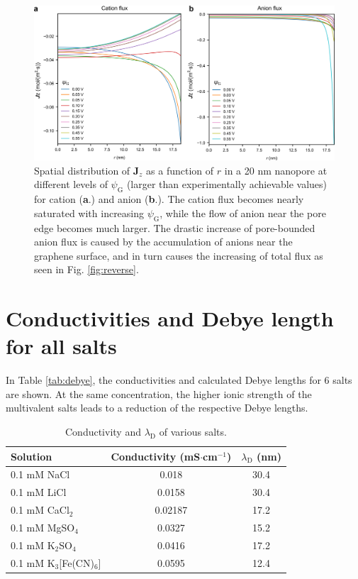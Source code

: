 \documentclass[manuscript=suppinfo,email=true, hyperref=true, keywords=false]{achemso}
\newcommand{\Fig}{Fig.}
\begin{document}
\begin{figure}[htbp]
  \centering
  \includegraphics[width=0.8\linewidth]{img/SI-flux-larger.png}
  \caption{Spatial distribution of $\boldsymbol{J}_{z}$ as a function
    of $r$ in a 20 nm nanopore at different levels of
    $\psi_{\mathrm{G}}$ (larger than experimentally achievable values)
    for cation (\textbf{a}.) and anion (\textbf{b}.). The cation flux
    becomes nearly saturated with increasing $\psi_{\mathrm{G}}$,
    while the flow of anion near the pore edge becomes much
    larger. The drastic increase of pore-bounded anion flux is caused
    by the accumulation of anions near the graphene surface, and in
    turn causes the increasing of total flux as seen in \Fig
    \ref{fig:reverse}.}
  \label{fig:large-V}
\end{figure}
\clearpage{}

\section{Conductivities and Debye length for all salts}
\label{sec:salts}
In Table \ref{tab:debye}, the conductivities and calculated Debye
lengths for 6 salts are shown. At the same concentration, the higher
ionic strength of the multivalent salts leads to a reduction of the
respective Debye lengths.

\begin{table}[htbp]
  \centering
  \begin{tabular}{lcc}
    \hline
    Solution & Conductivity (mS$\cdot$cm$^{-1}$) & $\lambda_{\mathrm{D}}$ (nm) \\
    \hline
    0.1 mM NaCl &0.018  &30.4\\
    0.1 mM LiCl &0.0158 &30.4\\
    0.1 mM CaCl$_{2}$&  0.02187 &17.2\\
    0.1 mM MgSO$_{4}$   &0.0327 &15.2\\
    0.1 mM K$_{2}$SO$_{4}$      &0.0416 &17.2\\
    0.1 mM K$_{3}$[Fe(CN)$_{6}$]&       0.0595  &12.4\\
    \hline
  \end{tabular}
  \caption{Conductivity and $\lambda_{\mathrm{D}}$ of various salts.}
  \label{tab:conductivity}
\end{table}


\section*{}
\label{sec:ref}

\end{document}
